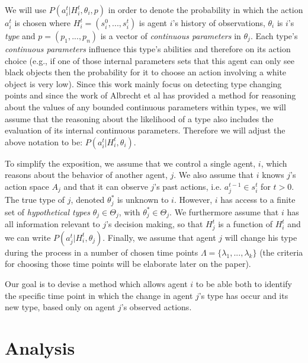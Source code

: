 \documentclass{article}
\newcommand{\typ}{\theta}
\newcommand{\Typ}{\Theta}
\begin{document}
We will use  $P(a_i^t | H_i^t, \typ_i, p)$ in order to denote the probability in which the action $a_i^t$ is chosen where $H_i^t = (s_i^0,...,s_i^t)$ is agent $i$'s history of observations, $\typ_i$ is $i$'s \emph{type} and $p = (p_1,...,p_n)$ is a vector of \emph{continuous parameters} in $\typ_j$. Each type's \emph{continuous parameters} influence this type's abilities and therefore on its action choice (e.g., if one of those internal parameters sets that this agent can only see black objects then the probability for it to choose an action involving a white object is very low). Since this work mainly focus on detecting type changing points and since the work of Albrecht et al has provided a method for reasoning about the values of any bounded continuous parameters within types, we will assume that the reasoning about the likelihood of a type also includes the evaluation of its internal continuous parameters. Therefore we will adjust the above notation to be: $P(a_i^t | H_i^t, \typ_i)$.  

To simplify the exposition, we assume that we control a single agent, $i$, which reasons about the behavior of another agent, $j$. We also assume that $i$ knows $j$'s action space $A_j$ and that it can observe $j$'s past actions, i.e. $a_j^{t-1} \in s_i^t$ for $t > 0$. The true type of $j$, denoted $\typ_j^*$ is unknown to $i$. However, $i$ has access to a finite set of \emph{hypothetical types} $\typ_j \in \Typ_j$, with $\typ_j^* \in \Typ_j$. We furthermore assume that $i$ has all information relevant to $j$'s decision making, so that $H_j^t$ is a function of $H_i^t$ and we can write $P(a_j^t | H_i^t, \typ_j)$. Finally, we assume that agent $j$ will change his type during  the process in a number of chosen time points $\Lambda = \{\lambda_1,...,\lambda_k\}$ (the criteria for choosing those time points will be elaborate later on the paper).

Our goal is to devise a method which allows agent $i$ to be able both to identify the specific time point in which the change in agent $j$'s type has occur and its new type, based only on agent $j$'s observed actions.

\section{Analysis}
\end{document}
